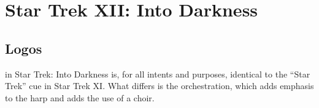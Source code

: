 
\chapter{Star Trek XII: Into Darkness}\label{ch:into_darkness}

\section{Logos}\label{sec:st 12}
 in Star Trek: Into Darkness is, for all intents and purposes, identical to the ``Star Trek'' cue in Star Trek XI. What differs is the orchestration, which adds emphasis to the harp and adds the use of a choir.

\clearpage



